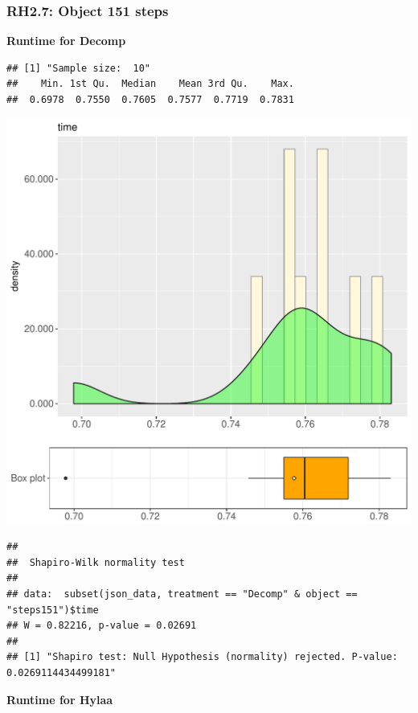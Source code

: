 \documentclass{article}\usepackage[]{graphicx}\usepackage[]{color}
\makeatletter
\def\maxwidth{ %
  \ifdim\Gin@nat@width>\linewidth
    \linewidth
  \else
    \Gin@nat@width
  \fi
}
\newenvironment{kframe}{%
 \def\at@end@of@kframe{}%
 \ifinner\ifhmode%
  \def\at@end@of@kframe{\end{minipage}}%
  \begin{minipage}{\columnwidth}%
 \fi\fi%
 \def\FrameCommand##1{\hskip\@totalleftmargin \hskip-\fboxsep
 \colorbox{shadecolor}{##1}\hskip-\fboxsep
     \hskip-\linewidth \hskip-\@totalleftmargin \hskip\columnwidth}%
 \MakeFramed {\advance\hsize-\width
   \@totalleftmargin\z@ \linewidth\hsize
   \@setminipage}}%
 {\par\unskip\endMakeFramed%
 \at@end@of@kframe}
\newenvironment{knitrout}{}{} %
\makeatother
\begin{document}
\subsubsection{RH2.7: Object 151 steps}

 \textbf{Runtime for Decomp}
\begin{knitrout}
\color{fgcolor}\begin{kframe}
\begin{verbatim}
## [1] "Sample size:  10"
##    Min. 1st Qu.  Median    Mean 3rd Qu.    Max. 
##  0.6978  0.7550  0.7605  0.7577  0.7719  0.7831
\end{verbatim}
\end{kframe}
\includegraphics[width=\maxwidth]{figure/RH2_Decomp_steps151-1} 
\begin{kframe}\begin{verbatim}
## 
## 	Shapiro-Wilk normality test
## 
## data:  subset(json_data, treatment == "Decomp" & object == "steps151")$time
## W = 0.82216, p-value = 0.02691
## 
## [1] "Shapiro test: Null Hypothesis (normality) rejected. P-value: 0.0269114434499181"
\end{verbatim}
\end{kframe}
\end{knitrout}
 \textbf{Runtime for Hylaa}
\end{document}
